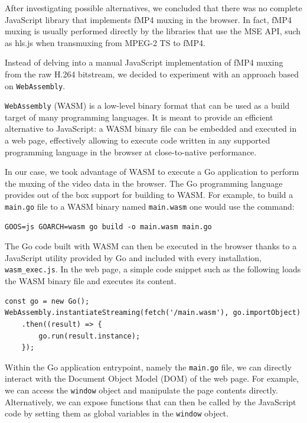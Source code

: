 After investigating possible alternatives, we concluded that there was no complete JavaScript library that implements fMP4 muxing in the browser. In fact, fMP4 muxing is usually performed directly by the libraries that use the MSE API, such as hls.js when transmuxing from MPEG-2 TS to fMP4.

Instead of delving into a manual JavaScript implementation of fMP4 muxing from the raw H.264 bitstream, we decided to experiment with an approach based on \texttt{WebAssembly}.

\texttt{WebAssembly} (WASM) is a low-level binary format that can be used as a build target of many programming languages. It is meant to provide an efficient alternative to JavaScript: a WASM binary file can be embedded and executed in a web page, effectively allowing to execute code written in any supported programming language in the browser at close-to-native performance.

In our case, we took advantage of WASM to execute a Go application to perform the muxing of the video data in the browser. The Go programming language provides out of the box support for building to WASM. For example, to build a \texttt{main.go} file to a WASM binary named \texttt{main.wasm} one would use the command:

\begin{verbatim}
GOOS=js GOARCH=wasm go build -o main.wasm main.go
\end{verbatim}

The Go code built with WASM can then be executed in the browser thanks to a JavaScript utility provided by Go and included with every installation, \texttt{wasm\_exec.js}. In the web page, a simple code snippet such as the following loads the WASM binary file and executes its content.

\begin{verbatim}
const go = new Go();
WebAssembly.instantiateStreaming(fetch('/main.wasm'), go.importObject)
    .then((result) => {
        go.run(result.instance);
    });
\end{verbatim}

Within the Go application entrypoint, namely the \texttt{main.go} file, we can directly interact with the Document Object Model (DOM) of the web page. For example, we can access the \texttt{window} object and manipulate the page contents directly. Alternatively, we can expose functions that can then be called by the JavaScript code by setting them as global variables in the \texttt{window} object.

